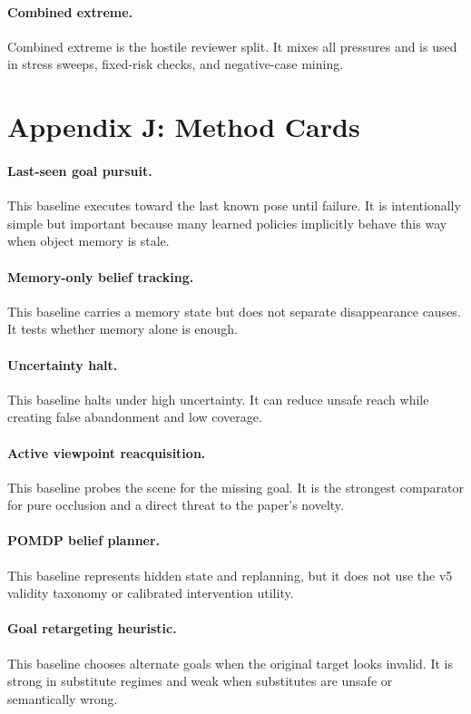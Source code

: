 \documentclass{article}
\begin{document}
\paragraph{Combined extreme.}
Combined extreme is the hostile reviewer split. It mixes all pressures and is used in stress sweeps, fixed-risk checks, and negative-case mining.

\section{Appendix J: Method Cards}
\paragraph{Last-seen goal pursuit.}
This baseline executes toward the last known pose until failure. It is intentionally simple but important because many learned policies implicitly behave this way when object memory is stale.

\paragraph{Memory-only belief tracking.}
This baseline carries a memory state but does not separate disappearance causes. It tests whether memory alone is enough.

\paragraph{Uncertainty halt.}
This baseline halts under high uncertainty. It can reduce unsafe reach while creating false abandonment and low coverage.

\paragraph{Active viewpoint reacquisition.}
This baseline probes the scene for the missing goal. It is the strongest comparator for pure occlusion and a direct threat to the paper's novelty.

\paragraph{POMDP belief planner.}
This baseline represents hidden state and replanning, but it does not use the v5 validity taxonomy or calibrated intervention utility.

\paragraph{Goal retargeting heuristic.}
This baseline chooses alternate goals when the original target looks invalid. It is strong in substitute regimes and weak when substitutes are unsafe or semantically wrong.
\end{document}
